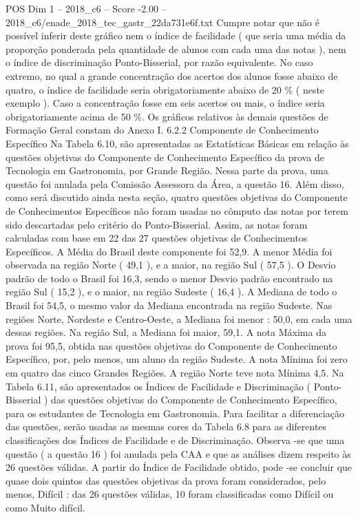 \begin{textsample}{POS Dim 1 – 2018\_c6 – Score -2.00 – 2018\_c6/enade\_2018\_tec\_gastr\_22da731e6f.txt}
Cumpre notar que não é possível inferir deste gráfico nem o índice de facilidade ( que seria uma média da proporção ponderada pela quantidade de alunos com cada uma das notas ), nem o índice de discriminação Ponto-Bisserial, por razão equivalente.
No caso extremo, no qual a grande concentração dos acertos dos alunos fosse abaixo de quatro, o índice de facilidade seria obrigatoriamente abaixo de 20 \% ( neste exemplo ).
Caso a concentração fosse em seis acertos ou mais, o índice seria obrigatoriamente acima de 50 \%.
Os gráficos relativos às demais questões de Formação Geral constam do Anexo I. 6.2.2 Componente de Conhecimento Específico Na Tabela 6.10, são apresentadas as Estatísticas Básicas em relação às questões objetivas do Componente de Conhecimento Específico da prova de Tecnologia em Gastronomia, por Grande Região.
Nessa parte da prova, uma questão foi anulada pela Comissão Assessora da Área, a questão 16.
Além disso, como será discutido ainda nesta seção, quatro questões objetivas do Componente de Conhecimentos Específicos não foram usadas no cômputo das notas por terem sido descartadas pelo critério do Ponto-Bisserial.
Assim, as notas foram calculadas com base em 22 das 27 questões objetivas de Conhecimentos Específicos.
A Média do Brasil deste componente foi 52,9.
A menor Média foi observada na região Norte ( 49,1 ), e a maior, na região Sul ( 57,5 ).
O Desvio padrão de todo o Brasil foi 16,3, sendo o menor Desvio padrão encontrado na região Sul ( 15,2 ), e o maior, na região Sudeste ( 16,4 ).
A Mediana de todo o Brasil foi 54,5, o mesmo valor da Mediana encontrada na região Sudeste.
Nas regiões Norte, Nordeste e Centro-Oeste, a Mediana foi menor : 50,0, em cada uma dessas regiões.
Na região Sul, a Mediana foi maior, 59,1.
A nota Máxima da prova foi 95,5, obtida nas questões objetivas do Componente de Conhecimento Específico, por, pelo menos, um aluno da região Sudeste.
A nota Mínima foi zero em quatro das cinco Grandes Regiões.
A região Norte teve nota Mínima 4,5.
Na Tabela 6.11, são apresentados os Índices de Facilidade e Discriminação ( Ponto-Bisserial ) das questões objetivas do Componente de Conhecimento Específico, para os estudantes de Tecnologia em Gastronomia.
Para facilitar a diferenciação das questões, serão usadas as mesmas cores da Tabela 6.8 para as diferentes classificações dos Índices de Facilidade e de Discriminação.
Observa -se que uma questão ( a questão 16 ) foi anulada pela CAA e que as análises dizem respeito às 26 questões válidas.
A partir do Índice de Facilidade obtido, pode -se concluir que quase dois quintos das questões objetivas da prova foram considerados, pelo menos, Difícil : das 26 questões válidas, 10 foram classificadas como Difícil ou como Muito difícil.

\end{textsample}
